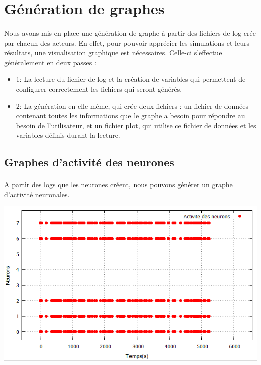 \documentclass[a4paper,10pt]{article}
\begin{document}
\subsection{}

\newpage

\section{Génération de graphes}

\paragraph{}
Nous avons mis en place une génération de graphe à partir des fichiers de log crée par chacun des acteurs. En effet, pour pouvoir apprécier les simulations et leurs résultats, une visualisation graphique est nécessaires.
Celle-ci s'effectue généralement en deux passes : 
\begin{itemize}
	\item{1}: La lecture du fichier de log et la création de variables qui permettent de configurer correctement les fichiers qui seront générés.
	\item{2}: La génération en elle-même, qui crée deux fichiers : un fichier de données contenant toutes les informations que le graphe a besoin pour répondre au besoin de l'utilisateur, et un fichier plot, qui utilise ce fichier de données et les variables définis durant la lecture.
\end{itemize}

\subsection{Graphes d’activité des neurones}
\paragraph{}
A partir des logs que les neurones créent, nous pouvons générer un graphe d’activité neuronales. 

\includegraphics[scale=0.95,right]{image/neuronActivity.png}
\end{document}
